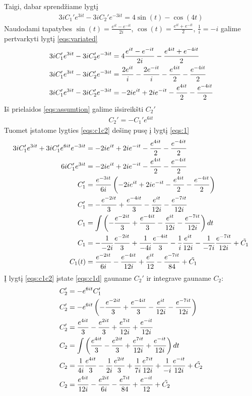 \documentclass[11pt]{article}
\begin{document}
Taigi, dabar sprendžiame lygtį
\begin{align}
3iC_1'e^{3it}-3iC_2'e^{-3it}=4\sin(t)-\cos(4t)\label{eqs:variated}
\end{align}
Naudodami tapatybes $\sin(t)=\frac{e^{it}-e^{-it}}{2i}$, $\cos(t)=\frac{e^{it}+e^{-it}}{2}$, $\frac{1}{i}=-i$ galime pertvarkyti lygtį \eqref{eqs:variated}
\begin{align}
3iC_1'e^{3it}-3iC_2'e^{-3it}&=4\frac{e^{it}-e^{-it}}{2i}-\frac{e^{4it}+e^{-4it}}{2}\notag\\
3iC_1'e^{3it}-3iC_2'e^{-3it}&=\frac{2e^{it}}{i}-\frac{2e^{-it}}{i}-\frac{e^{4it}}{2}-\frac{e^{-4it}}{2}\notag\\
3iC_1'e^{3it}-3iC_2'e^{-3it}&=-2ie^{it}+2ie^{-it}-\frac{e^{4it}}{2}-\frac{e^{-4it}}{2}\label{eqs:1}
\end{align}
Iš prielaidos \eqref{eqs:assumtion} galime išsireikšti $C_2'$
\begin{align}
C_2'=-C_1'e^{6it} \label{eqs:c1c2}    
\end{align}
Tuomet įstatome lygties \eqref{eqs:c1c2} dešinę pusę į lygtį \eqref{eqs:1}
\begin{align}
3iC_1'e^{3it}+3iC_1'e^{6it}e^{-3it}&=-2ie^{it}+2ie^{-it}-\frac{e^{4it}}{2}-\frac{e^{-4it}}{2} \notag\\
6iC_1'e^{3it}&=-2ie^{it}+2ie^{-it}-\frac{e^{4it}}{2}-\frac{e^{-4it}}{2} \notag\\
C_1'&=\frac{e^{-3it}}{6i}\left(-2ie^{it}+2ie^{-it}-\frac{e^{4it}}{2}-\frac{e^{-4it}}{2}\right) \notag\\
C_1'&=-\frac{e^{-2it}}{3}+\frac{e^{-4it}}{3}-\frac{e^{it}}{12i}-\frac{e^{-7it}}{12i} \label{eqs:c1d}\\
C_1&=\int\left(-\frac{e^{-2it}}{3}+\frac{e^{-4it}}{3}-\frac{e^{it}}{12i}-\frac{e^{-7it}}{12i}\right)dt \notag\\
C_1&=-\frac{1}{-2i}\frac{e^{-2it}}{3}+\frac{1}{-4i}\frac{e^{-4it}}{3}-\frac{1}{i}\frac{e^{it}}{12i}-\frac{1}{-7i}\frac{e^{-7it}}{12i}+\tilde{C_1}\notag\\
C_1(t)&=\frac{e^{-2it}}{6i}-\frac{e^{-4it}}{12i}+\frac{e^{it}}{12}-\frac{e^{-7it}}{84}+\tilde{C_1} \label{eqs:c1}
\end{align}
Į lygtį \eqref{eqs:c1c2} įstate \eqref{eqs:c1d} gauname $C_2'$ ir integrave gauname $C_2$:
\begin{align}
C_2'&=-e^{6it}C_1'\notag\\
C_2'&=-e^{6it}\left(-\frac{e^{-2it}}{3}+\frac{e^{-4it}}{3}-\frac{e^{it}}{12i}-\frac{e^{-7it}}{12i}\right)\notag\\
C_2'&=\frac{e^{4it}}{3}-\frac{e^{2it}}{3}+\frac{e^{7it}}{12i}+\frac{e^{-it}}{12i}\\
C_2&=\int\left(\frac{e^{4it}}{3}-\frac{e^{2it}}{3}+\frac{e^{7it}}{12i}+\frac{e^{-it}}{12i}\right)dt\notag\\
C_2&=\frac{1}{4i}\frac{e^{4it}}{3}-\frac{1}{2i}\frac{e^{2it}}{3}+\frac{1}{7i}\frac{e^{7it}}{12i}+\frac{1}{-i}\frac{e^{-it}}{12i}+\tilde{C_2}\notag\\
C_2&=\frac{e^{4it}}{12i}-\frac{e^{2it}}{6i}-\frac{e^{7it}}{84}+\frac{e^{-it}}{12}+\tilde{C_2}
\end{align}
\end{document}
